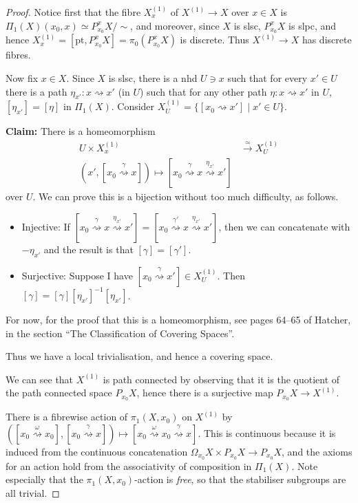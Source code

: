 \documentclass{tufte-handout}
\def\pt {\mathrm{pt}}
\theoremstyle{definition}
\begin{document}
\begin{proof}
Notice first that the fibre $X^{(1)}_x$ of $X^{(1)} \to X$ over $x\in X$ is $\Pi_1(X)(x_0,x) \simeq P_{x_0}^xX/\sim$, and moreover, since $X$ is slsc, $P_{x_0}^xX$ is slpc, and hence $X^{(1)}_x=[\pt,P_{x_0}^xX]=\pi_0(P_{x_0}^xX)$ is discrete. Thus $X^{(1)} \to X$ has discrete fibres.

Now fix $x\in X$. Since $X$ is slsc, there is a nhd $U\ni x$ such that for every $x'\in U$ there is a path $\eta_{x'}\colon x\rightsquigarrow x'$ (in $U$) such that for any other path $\eta\colon x \rightsquigarrow x'$ in $U$, $[\eta_{x'}]=[\eta]$ in $\Pi_1(X)$. Consider $X^{(1)}_U = \{[x_0\rightsquigarrow x']\mid x'\in U\}$.

\textbf{Claim:} There is a homeomorphism 
\begin{align*}
U\times X^{(1)}_x & \xrightarrow{\simeq} X^{(1)}_U \\
(x',[x_0 \stackrel{\gamma}{\rightsquigarrow} x]) \mapsto [x_0 \stackrel{\gamma}{\rightsquigarrow} x \stackrel{\eta_{x'}}{\rightsquigarrow} x']
\end{align*}
over $U$. We can prove this is a bijection without too much difficulty, as follows. 
\begin{itemize}
\item Injective: If $[x_0 \stackrel{\gamma}{\rightsquigarrow} x \stackrel{\eta_{x'}}{\rightsquigarrow} x'] = [x_0 \stackrel{\gamma'}{\rightsquigarrow} x \stackrel{\eta_{x'}}{\rightsquigarrow} x']$, then we can concatenate with $-\eta_{x'}$ and the result is that $[\gamma] = [\gamma']$.
\item Surjective: Suppose I have $[x_0 \stackrel{\gamma}{\rightsquigarrow} x'] \in X^{(1)}_U$. Then $[\gamma] = [\gamma][\eta_{x'}]^{-1}[\eta_{x'}]$.
\end{itemize}

For now, for the proof that this is a homeomorphism, see pages 64--65 of Hatcher, in the section 
``The Classification of Covering Spaces''.

Thus we have a local trivialisation, and hence a covering space.

We can see that $X^{(1)}$ is path connected by observing that it is the quotient of the path connected space $P_{x_0} X$, hence there is a surjective map $P_{x_0}X \to X^{(1)}$. 

There is a fibrewise action of $\pi_1(X,x_0)$ on $X^{(1)}$ by $([x_0 
\stackrel{\omega}{\rightsquigarrow} x_0],[x_0 \stackrel{\gamma}{\rightsquigarrow} x]) \mapsto 
[x_0 \stackrel{\omega}{\rightsquigarrow} x_0 \stackrel{\gamma}{\rightsquigarrow} x]$. This is 
continuous because it is induced from the continuous concatenation $\Omega_{x_0}X \times P_{x_0}X 
\to P_{x_0}X$, and the axioms for an action hold from the associativity of composition in 
$\Pi_1(X)$. Note especially that the $\pi_1(X,x_0)$-action is \emph{free}, so that the 
stabiliser subgroups are all trivial.


\end{proof}
\end{document}
